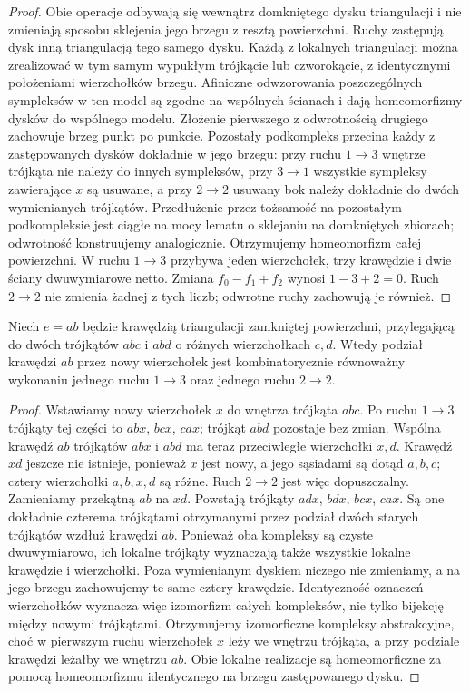 \begin{proof}
Obie operacje odbywają się wewnątrz domkniętego dysku
triangulacji i nie zmieniają sposobu sklejenia jego brzegu
z resztą powierzchni. Ruchy zastępują dysk inną
triangulacją tego samego dysku. Każdą z lokalnych
triangulacji można zrealizować w tym samym wypukłym
trójkącie lub czworokącie, z identycznymi położeniami
wierzchołków brzegu. Afiniczne odwzorowania poszczególnych
sympleksów w ten model są zgodne na wspólnych ścianach
i dają homeomorfizmy dysków do wspólnego modelu. Złożenie
pierwszego z odwrotnością drugiego zachowuje brzeg
punkt po punkcie. Pozostały podkompleks przecina każdy
z zastępowanych dysków dokładnie w jego brzegu: przy
ruchu $1\to3$ wnętrze trójkąta nie należy do innych
sympleksów, przy $3\to1$ wszystkie sympleksy zawierające
$x$ są usuwane, a przy $2\to2$ usuwany bok należy
dokładnie do dwóch wymienianych trójkątów.
Przedłużenie przez tożsamość na pozostałym podkompleksie
jest ciągłe na mocy lematu o sklejaniu na domkniętych
zbiorach; odwrotność konstruujemy analogicznie.
Otrzymujemy homeomorfizm całej powierzchni.
W ruchu $1\to3$ przybywa jeden wierzchołek, trzy krawędzie
i dwie ściany dwuwymiarowe netto. Zmiana $f_0-f_1+f_2$
wynosi $1-3+2=0$. Ruch $2\to2$ nie zmienia żadnej z tych
liczb; odwrotne ruchy zachowują je również.
\end{proof}

\pagebreak[3]
\begin{stwierdzenie}
Niech $e=ab$ będzie krawędzią triangulacji zamkniętej
powierzchni, przylegającą do dwóch trójkątów $abc$
i $abd$ o różnych wierzchołkach $c,d$. Wtedy podział krawędzi
$ab$ przez nowy wierzchołek
jest kombinatorycznie równoważny wykonaniu jednego
ruchu $1\to3$ oraz jednego ruchu $2\to2$.
\end{stwierdzenie}

\begin{proof}
Wstawiamy nowy wierzchołek $x$ do wnętrza trójkąta $abc$.
Po ruchu $1\to3$ trójkąty tej części to $abx$, $bcx$, $cax$;
trójkąt $abd$ pozostaje bez zmian. Wspólna krawędź $ab$
trójkątów $abx$ i $abd$ ma teraz przeciwległe wierzchołki
$x,d$. Krawędź $xd$ jeszcze nie istnieje, ponieważ $x$ jest
nowy, a jego sąsiadami są dotąd $a,b,c$; cztery wierzchołki
$ a,b,x,d$ są różne. Ruch $2\to2$ jest więc dopuszczalny.
Zamieniamy przekątną $ab$ na $xd$. Powstają trójkąty $adx$, $bdx$, $bcx$, $cax$.
Są one dokładnie czterema trójkątami otrzymanymi przez
podział dwóch starych trójkątów wzdłuż krawędzi $ab$.
Ponieważ oba kompleksy są czyste dwuwymiarowo,
ich lokalne trójkąty wyznaczają także wszystkie
lokalne krawędzie i wierzchołki. Poza wymienianym
dyskiem niczego nie zmieniamy, a na jego brzegu
zachowujemy te same cztery krawędzie.
Identyczność oznaczeń wierzchołków wyznacza więc
izomorfizm całych kompleksów, nie tylko bijekcję
między nowymi trójkątami.
Otrzymujemy izomorficzne kompleksy abstrakcyjne,
choć w pierwszym ruchu wierzchołek $x$ leży
we wnętrzu trójkąta, a przy podziale krawędzi
leżałby we wnętrzu $ab$. Obie lokalne realizacje
są homeomorficzne za pomocą homeomorfizmu
identycznego na brzegu zastępowanego dysku.
\end{proof}

